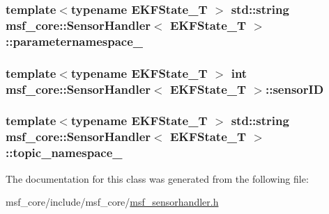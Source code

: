 \hypertarget{classmsf__core_1_1SensorHandler_a1be62365d3ce3c6cbfcca2e4e453790f}{
\subsubsection[{parameternamespace\-\_\-}]{\setlength{\rightskip}{0pt plus 5cm}template$<$typename E\-K\-F\-State\-\_\-\-T $>$ std\-::string {\bf msf\-\_\-core\-::\-Sensor\-Handler}$<$ E\-K\-F\-State\-\_\-\-T $>$\-::parameternamespace\-\_\-\hspace{0.3cm}{\ttfamily [protected]}}}\label{classmsf__core_1_1SensorHandler_a1be62365d3ce3c6cbfcca2e4e453790f}
\hypertarget{classmsf__core_1_1SensorHandler_ab6b02c25292da4a56ff7ebf3edb1b17b}{
\subsubsection[{sensor\-I\-D}]{\setlength{\rightskip}{0pt plus 5cm}template$<$typename E\-K\-F\-State\-\_\-\-T $>$ int {\bf msf\-\_\-core\-::\-Sensor\-Handler}$<$ E\-K\-F\-State\-\_\-\-T $>$\-::sensor\-I\-D\hspace{0.3cm}{\ttfamily [protected]}}}\label{classmsf__core_1_1SensorHandler_ab6b02c25292da4a56ff7ebf3edb1b17b}
\hypertarget{classmsf__core_1_1SensorHandler_a7795149ef5cef567fcc049bbc888c9ed}{
\subsubsection[{topic\-\_\-namespace\-\_\-}]{\setlength{\rightskip}{0pt plus 5cm}template$<$typename E\-K\-F\-State\-\_\-\-T $>$ std\-::string {\bf msf\-\_\-core\-::\-Sensor\-Handler}$<$ E\-K\-F\-State\-\_\-\-T $>$\-::topic\-\_\-namespace\-\_\-\hspace{0.3cm}{\ttfamily [protected]}}}\label{classmsf__core_1_1SensorHandler_a7795149ef5cef567fcc049bbc888c9ed}


The documentation for this class was generated from the following file\-:\begin{DoxyCompactItemize}
\item 
msf\-\_\-core/include/msf\-\_\-core/\hyperlink{msf__sensorhandler_8h}{msf\-\_\-sensorhandler.\-h}\end{DoxyCompactItemize}
